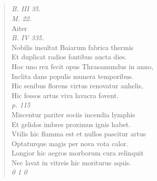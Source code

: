 \documentclass[11pt, a4paper]{report}
\begin{document}
            \subsection*{}
      \begin{verse}
      \textit{B. III 35.} \\ \textit{M. 22.} \\ Aiter \\ \textit{B. IV 335.} \\ Nobilis insultat Baiarum fabrica thermis \\ Et duplicat radios fontibus aucta dies. \\ Hoc uno rex fecit opus Thrasamundus in anno, \\ Inclita dans populis munera temporibus. \\ Hic senibus florens virtus renovatur anhelis, \\ Hic fessos artus viva lavacra fovent. \\ \textit{p. 115} \\ Miscentur pariter sociis incendia lymphis \\ Et gelidos imbres proximus ignis habet. \\ Vtilis hic flamma est et nullos pascitur artus \\ Optaturque magis per nova vota calor. \\ Longior hic aegros morborum cura relinquit \\ Nec lavat in vitreis hic moriturus aquis. \\ \textit{0 1 0} \\ 
      \end{verse}
  
\end{document}
